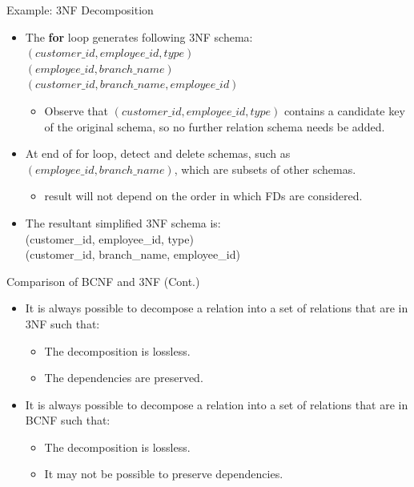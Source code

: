 \documentclass{beamer}
\begin{document}
\begin{frame}[fragile]{Example: 3NF Decomposition}
    \footnotesize
    \begin{itemize}
        \item The \textbf{for} loop generates following 3NF schema: \\
            \quad $(customer\_id, employee\_id, type)$ \\
            \quad $(employee\_id, branch\_name)$ \\
            \quad $(customer\_id, branch\_name, employee\_id)$
                \begin{itemize}
                    \item Observe that $(customer\_id, employee\_id, type)$ contains a candidate key of the original schema, so no further relation schema needs be added.
                \end{itemize}
        \item At end of for loop, detect and delete schemas, such as $(employee\_id, branch\_name)$, which are subsets of other schemas.
            \begin{itemize}
                \item result will not depend on the order in which FDs are considered.
            \end{itemize}
        \item The resultant simplified 3NF schema is: \\
            \quad (customer\_id, employee\_id, type) \\
            \quad (customer\_id, branch\_name, employee\_id)
    \end{itemize}
\end{frame}

\begin{frame}{Comparison of BCNF and 3NF (Cont.)}
    \begin{itemize}
        \item It is always possible to decompose a relation into a set of relations that are in 3NF such that:
            \begin{itemize}
                \item The decomposition is lossless.
                \item The dependencies are preserved.
            \end{itemize}
        \item It is always possible to decompose a relation into a set of relations that are in BCNF such that:
            \begin{itemize}
                \item The decomposition is lossless.
                \item It may not be possible to preserve dependencies.
            \end{itemize}
    \end{itemize}
\end{frame}
\end{document}
